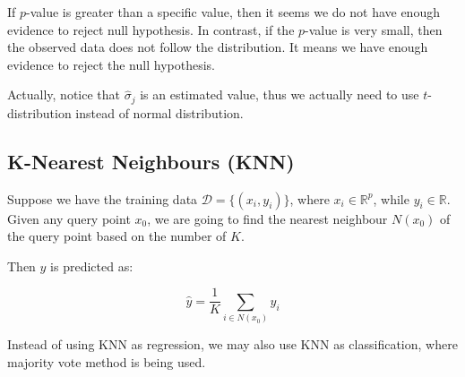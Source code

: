 \documentclass{article}
\theoremstyle{MyNonumberplain}
\theoremstyle{break}
\theoremstyle{break}
\theoremstyle{break}
\theoremstyle{break}
\begin{document}
If $p$-value is greater than a specific value, then it seems we do not have enough evidence to reject null hypothesis. 
In contrast, if the $p$-value is very small, then the observed data does not follow the distribution. It means we have enough evidence to 
reject the null hypothesis.

Actually, notice that $\hat\sigma_j$ is an estimated value, thus we actually need to use $t$-distribution instead of normal distribution.

\subsection{K-Nearest Neighbours (KNN)}

Suppose we have the training data $\mathcal{D}=\bigl\{(x_i,y_i)\bigr\}$, where $x_i\in\mathbb{R}^p$, while $y_i\in\mathbb{R}$.
Given any query point $x_0$, we are going to find the nearest neighbour $N(x_0)$ of the query point based on the number of $K$.

\begin{center}
\end{center}

Then $\hat y$ is predicted as:

$$
\hat y=\frac{1}{K}\sum_{i\in N(x_0)}y_i
$$

Instead of using KNN as regression, we may also use KNN as classification, where majority vote method is being used.
\end{document}
